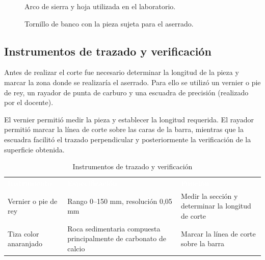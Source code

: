 \documentclass[12pt,a4paper]{article}
\newcommand{\encab}[1]{\textcolor{white}{\sffamily\bfseries #1}}
\begin{document}
\begin{figure}[H]
	\centering
	\caption{Arco de sierra y hoja utilizada en el laboratorio.}
\end{figure}

\begin{figure}[H]
	\centering
	\caption{Tornillo de banco con la pieza sujeta para el aserrado.}
\end{figure}

\subsection{Instrumentos de trazado y verificación}
Antes de realizar el corte fue necesario determinar la longitud de la pieza y
marcar la zona donde se realizaría el aserrado. Para ello se utilizó un vernier
o pie de rey, un rayador de punta de carburo y una escuadra de precisión
(realizado por el docente).

\vspace{6pt}

El vernier permitió medir la pieza y establecer la longitud requerida. El
rayador permitió marcar la línea de corte sobre las caras de la barra, mientras
que la escuadra facilitó el trazado perpendicular y posteriormente la
verificación de la superficie obtenida.

\begin{table}[!htb]
	\centering
	\caption{Instrumentos de trazado y verificación}
	\small
	\begin{tabularx}{\linewidth}{
			>{\raggedright\arraybackslash}l
			>{\raggedright\arraybackslash}X
			>{\raggedright\arraybackslash}X
		}
		\rowcolor{darkblue}
		\encab{Instrumento}                                               &
		\encab{Especificación}                                            &
		\encab{Función}
		\\
		Vernier o pie de rey                                              &
		Rango 0–150 mm, resolución 0,05 mm                                &
		Medir la sección y determinar la longitud de corte
		\\
		Tiza color anaranjado                                             &
		Roca sedimentaria compuesta principalmente de carbonato de calcio &
		Marcar la línea de corte sobre la barra
		\\
	\end{tabularx}
\end{table}
\end{document}
